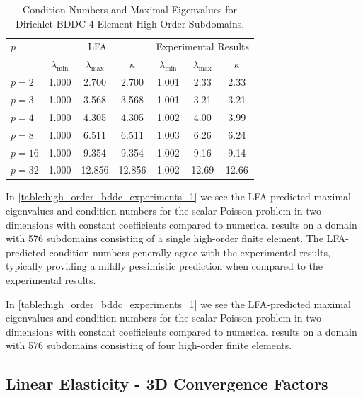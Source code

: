 \documentclass[review]{siamart190516}
\begin{document}
\begin{table}[ht!]
\begin{center}
\begin{tabular}{l ccc ccc}
  \toprule
  $p$  &  \multicolumn{3}{c}{LFA}  &  \multicolumn{3}{c}{Experimental Results}  \\
                      &  $\lambda_{\text{min}}$  &  $\lambda_{\text{max}}$  &  $\kappa$ & $\lambda_{\text{min}}$  &  $\lambda_{\text{max}}$ & $\kappa$  \\
  \toprule
  $p = 2$   &  1.000  &   2.700  &   2.700  &  1.001  &   2.33  &   2.33  \\
  $p = 3$   &  1.000  &   3.568  &   3.568  &  1.001  &   3.21  &   3.21  \\
  $p = 4$   &  1.000  &   4.305  &   4.305  &  1.002  &   4.00  &   3.99  \\
  $p = 8$   &  1.000  &   6.511  &   6.511  &  1.003  &   6.26  &   6.24  \\
  $p = 16$  &  1.000  &   9.354  &   9.354  &  1.002  &   9.16  &   9.14  \\
  $p = 32$  &  1.000  &  12.856  &  12.856  &  1.002  &  12.69  &  12.66  \\
  \bottomrule
\end{tabular}
\end{center}
\caption{Condition Numbers and Maximal Eigenvalues for Dirichlet BDDC 4 Element High-Order Subdomains.}
\label{table:high_order_bddc_experiments_2}
\end{table}

In \cref{table:high_order_bddc_experiments_1} we see the LFA-predicted maximal eigenvalues and condition numbers for the scalar Poisson problem in two dimensions with constant coefficients compared to numerical results on a domain with 576 subdomains consisting of a single high-order finite element.
The LFA-predicted condition numbers generally agree with the experimental results, typically providing a mildly pessimistic prediction when compared to the experimental results.

In \cref{table:high_order_bddc_experiments_1} we see the LFA-predicted maximal eigenvalues and condition numbers for the scalar Poisson problem in two dimensions with constant coefficients compared to numerical results on a domain with 576 subdomains consisting of four high-order finite elements.

\subsection{Linear Elasticity - 3D Convergence Factors}\label{sec:solidsresults}
\end{document}
